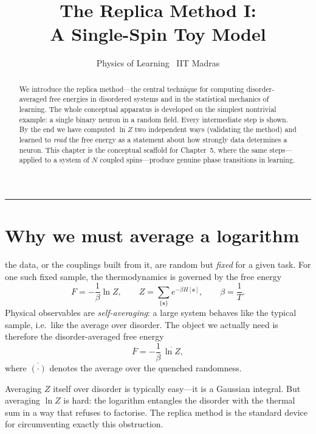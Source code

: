 \documentclass[nobib,justified]{tufte-handout}
\title{The Replica Method I:\\ A Single-Spin Toy Model}
\author{Physics of Learning \textbullet\ IIT Madras}
\date{}
\newcommand{\dbar}[1]{\overline{#1}}            %
\begin{document}
\maketitle
{}\vspace{4pt}\hrule\vspace{10pt}

\begin{abstract}
\noindent
We introduce the replica method---the central technique for computing
disorder-averaged free energies in disordered systems and in the
statistical mechanics of learning. The whole conceptual apparatus is
developed on the simplest nontrivial example: a single binary neuron
in a random field. Every intermediate step is shown. By the end we have
computed $\dbar{\ln Z}$ two independent ways (validating the method) and
learned to \emph{read} the free energy as a statement about how strongly
data determines a neuron. This chapter is the conceptual scaffold for
Chapter~5, where the same steps---applied to a system of $N$ coupled
spins---produce genuine phase transitions in learning.
\end{abstract}

\section{Why we must average a logarithm}

 the data, or the couplings built from
it, are random but \emph{fixed} for a given task.
For one such fixed sample, the thermodynamics is governed by the free
energy
\[
  F = -\frac{1}{\beta}\ln Z, \qquad
  Z = \sum_{\{\mathbf s\}} e^{-\beta H[\mathbf s]}, \qquad \beta = \frac1T .
\]
Physical observables are \emph{self-averaging}: a large system behaves
like the typical sample, i.e.\ like the average over disorder. The object
we actually need is therefore the disorder-averaged free energy
\[
  \dbar{F} = -\frac{1}{\beta}\,\dbar{\ln Z},
\]
where $\dbar{(\cdot)}$ denotes the average over the quenched randomness.

 Averaging $Z$ itself over disorder is
typically easy---it is a Gaussian integral. But averaging $\ln Z$ is hard:
the logarithm entangles the disorder with the thermal sum in a way that
refuses to factorise. The replica method is the standard device for
circumventing exactly this obstruction.
\end{document}
